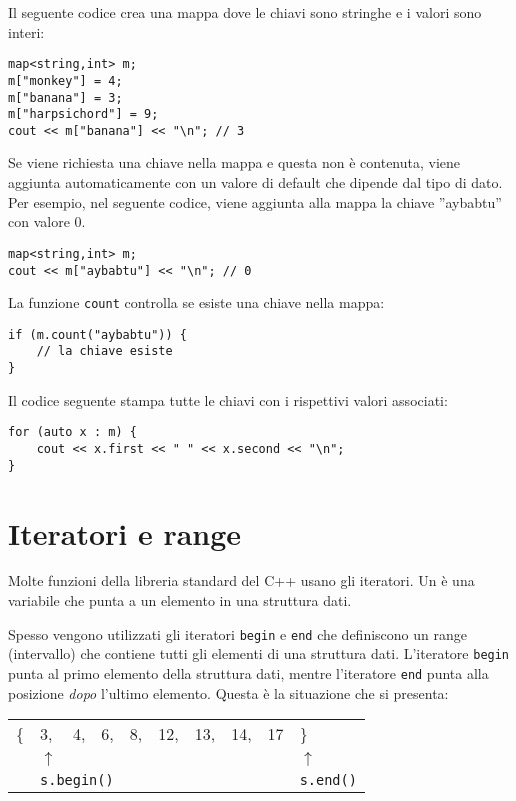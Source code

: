 Il seguente codice crea una mappa
dove le chiavi sono stringhe e i valori sono interi:

\begin{lstlisting}
map<string,int> m;
m["monkey"] = 4;
m["banana"] = 3;
m["harpsichord"] = 9;
cout << m["banana"] << "\n"; // 3
\end{lstlisting}

Se viene richiesta una chiave nella mappa
e questa non è contenuta,
viene aggiunta automaticamente con un valore 
di default che dipende dal tipo di dato.
Per esempio, nel seguente codice,
viene aggiunta alla mappa la chiave
''aybabtu'' con valore 0.

\begin{lstlisting}
map<string,int> m;
cout << m["aybabtu"] << "\n"; // 0
\end{lstlisting}

La funzione \texttt{count} controlla
se esiste una chiave nella mappa:

\begin{lstlisting}
if (m.count("aybabtu")) {
    // la chiave esiste
}
\end{lstlisting}
Il codice seguente stampa tutte le chiavi con i rispettivi valori associati:
\begin{lstlisting}
for (auto x : m) {
    cout << x.first << " " << x.second << "\n";
}
\end{lstlisting}

\section{Iteratori e range}


Molte funzioni della libreria standard del C++
usano gli iteratori.
Un  è una variabile
che punta a un elemento in una struttura dati.

Spesso vengono utilizzati gli iteratori \texttt{begin}
e \texttt{end} che definiscono un range (intervallo)
che contiene tutti gli elementi di una struttura dati.
L'iteratore \texttt{begin} punta al primo elemento 
della struttura dati,
mentre l'iteratore \texttt{end} punta alla posizione \emph{dopo}
l'ultimo elemento.
Questa è la situazione che si presenta:

\begin{center}
\begin{tabular}{llllllllll}
\{ & 3, & 4, & 6, & 8, & 12, & 13, & 14, & 17 & \} \\
& $\uparrow$ & & & & & & & & $\uparrow$ \\
& \multicolumn{3}{l}{\texttt{s.begin()}} & & & & & & \texttt{s.end()} \\
\end{tabular}
\end{center}


